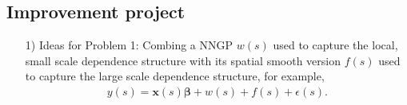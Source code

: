 \documentclass[
12pt, %
a4paper, %
oneside, %
headinclude,footinclude, %
BCOR5mm, %
]{scrartcl}
\begin{document}
\subsection{\textcolor[rgb]{1.00,0.00,0.50}{Improvement project}}
\begin{itemize}
 \item [1)] Ideas for Problem 1: Combing a NNGP $w(s)$ used to capture the \textcolor[rgb]{0.50,0.50,0.50}{local, small scale dependence structure} with its spatial smooth version $f(s)$ used to capture the \textcolor[rgb]{0.50,0.50,0.50}{large scale dependence structure}, for example,
\begin{equation}
\begin{aligned}
  y(s) = \boldsymbol{x}(s)\boldsymbol{\beta} + w(s) + f(s) + \epsilon(s).
\end{aligned} \label{DP1}
\end{equation}
%

\end{itemize}
\end{document}
